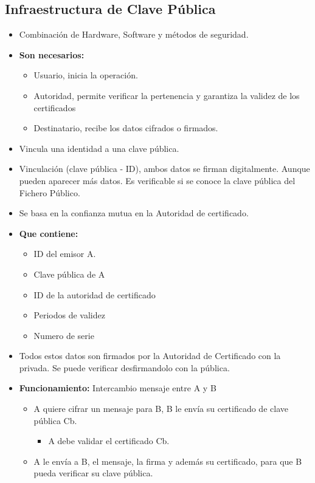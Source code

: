 \documentclass[12pt, twoside, openright]{report} %
\begin{document}
\subsection{Infraestructura de Clave Pública}
\begin{itemize}
	\item Combinación de Hardware, Software y métodos de seguridad.
	\item \textbf{Son necesarios:}
	      \begin{itemize}
		      \item Usuario, inicia la operación.
		      \item Autoridad, permite verificar la pertenencia y garantiza la validez de los certificados
		      \item Destinatario, recibe los datos cifrados o firmados.
	      \end{itemize}
	\item Vincula una identidad a una clave pública.
	\item Vinculación (clave pública - ID), ambos datos se firman digitalmente. Aunque pueden aparecer más datos. Es verificable si se conoce la clave pública del Fichero Público.
	\item Se basa en la confianza mutua en la Autoridad de certificado.
	\item \textbf{Que contiene:}
	      \begin{itemize}
		      \item ID del emisor A.
		      \item Clave pública de A
		      \item ID de la autoridad de certificado
		      \item Periodos de validez
		      \item Numero de serie
	      \end{itemize}
	\item Todos estos datos son firmados por la Autoridad de Certificado con la privada. Se puede verificar desfirmandolo con la pública.
	\item \textbf{Funcionamiento:} Intercambio mensaje entre A y B
	      \begin{itemize}
		      \item A quiere cifrar un mensaje para B, B le envía su certificado de clave pública Cb.
		            \begin{itemize}
			            \item A debe validar el certificado Cb.
		            \end{itemize}
		      \item A le envía a B, el mensaje, la firma y además su certificado, para que B pueda verificar su clave pública.

\end{itemize}
\end{itemize}
\end{document}

